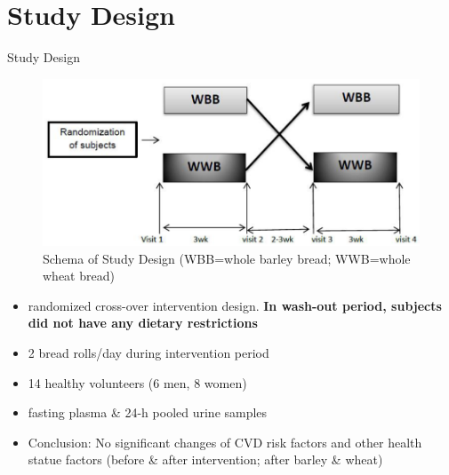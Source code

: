 \documentclass{beamer}
\begin{document}
\section{Study Design}
 \begin{frame}{Study Design}
 \begin{figure}[h]
    \centering
    \includegraphics[scale=0.3]{images/studes.PNG}
    \caption{Schema of Study Design (WBB=whole barley bread; WWB=whole wheat bread)}
        \label{fig:studes}
\end{figure}
{\footnotesize
\begin{itemize}
\item randomized cross-over intervention design. \textbf{In wash-out period, subjects did not have any dietary restrictions}
\item 2 bread rolls/day during intervention period
\item 14 healthy volunteers (6 men, 8 women)
\item fasting plasma \& 24-h pooled urine samples
\item Conclusion: No significant changes of CVD risk factors and other health statue factors (before \& after intervention; after barley \& wheat)
\end{itemize}}
 \end{frame}
 

\end{document}

